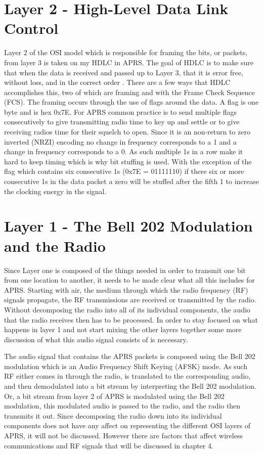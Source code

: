 \section{Layer 2 - High-Level Data Link Control}
Layer 2 of the OSI model which is responsible for framing the bits, or packets, from layer 3 is taken on my HDLC in APRS. The goal of HDLC is to make sure that when the data is received and passed up to Layer 3, that it is error free, without loss, and in the correct order \cite{Javvin2006}. There are a few ways that HDLC accomplishes this, two of which are framing and with the Frame Check Sequence (FCS). The framing occurs through the use of flags around the data. A flag is one byte and is hex 0x7E. For APRS common practice is to send multiple flags consecutively to give transmitting radio time to key up and settle or to give receiving radios time for their squelch to open. Since it is an non-return to zero inverted (NRZI) encoding no change in frequency corresponds to a 1 and a change in frequency corresponds to a 0. As such multiple 1s in a row make it hard to keep timing which is why bit stuffing is used. With the exception of the flag which contains six consecutive 1s (0x7E = 01111110) if there six or more consecutive 1s in the data packet a zero will be stuffed after the fifth 1 to increase the clocking energy in the signal.

\section{Layer 1 - The Bell 202 Modulation and the Radio}
Since Layer one is composed of the things needed in order to transmit one bit from one location to another, it needs to be made clear what all this includes for APRS. Starting with air, the medium through which the radio frequency (RF) signals propagate, the RF transmissions are received or transmitted by the radio. Without decomposing the radio into all of its individual components, the audio that the radio receives then has to be processed. In order to stay focused on what happens in layer 1 and not start mixing the other layers together some more discussion of what this audio signal consists of is necessary.

The audio signal that contains the APRS packets is composed using the Bell 202 modulation which is an Audio Frequency Shift Keying (AFSK) mode. As such RF either comes in through the radio, is translated to the corresponding audio, and then demodulated into a bit stream by interpreting the Bell 202 modulation. Or, a bit stream from layer 2 of APRS is modulated using the Bell 202 modulation, this modulated audio is passed to the radio, and the radio then transmits it out. Since decomposing the radio down into its individual components does not have any affect on representing the different OSI layers of APRS, it will not be discussed. However there are factors that affect wireless communications and RF signals that will be discussed in chapter 4.

